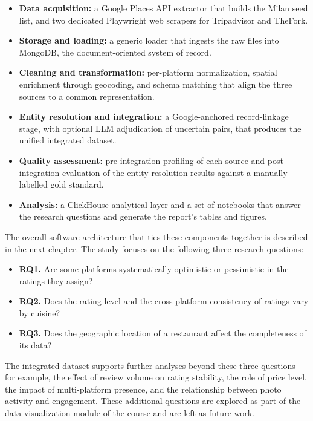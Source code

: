 \begin{itemize}
\item \textbf{Data acquisition:} a Google Places API extractor that builds the Milan seed list, and two dedicated Playwright web scrapers for Tripadvisor and TheFork.
\item \textbf{Storage and loading:} a generic loader that ingests the raw files into MongoDB, the document-oriented system of record.
\item \textbf{Cleaning and transformation:} per-platform normalization, spatial enrichment through geocoding, and schema matching that align the three sources to a common representation.
\item \textbf{Entity resolution and integration:} a Google-anchored record-linkage stage, with optional LLM adjudication of uncertain pairs, that produces the unified integrated dataset.
\item \textbf{Quality assessment:} pre-integration profiling of each source and post-integration evaluation of the entity-resolution results against a manually labelled gold standard.
\item \textbf{Analysis:} a ClickHouse analytical layer and a set of notebooks that answer the research questions and generate the report's tables and figures.
\end{itemize}

The overall software architecture that ties these components together is described in the next chapter. The study focuses on the following three research questions:

\begin{itemize}
\item \textbf{RQ1.} Are some platforms systematically optimistic or pessimistic in the ratings they assign?
\item \textbf{RQ2.} Does the rating level and the cross-platform consistency of ratings vary by cuisine?
\item \textbf{RQ3.} Does the geographic location of a restaurant affect the completeness of its data?
\end{itemize}

The integrated dataset supports further analyses beyond these three questions --- for example, the effect of review volume on rating stability, the role of price level, the impact of multi-platform presence, and the relationship between photo activity and engagement. These additional questions are explored as part of the data-visualization module of the course and are left as future work.
